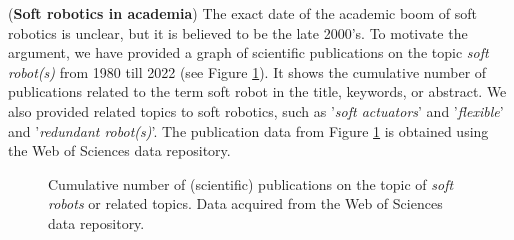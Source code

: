 
% 


\clearpage
(\textbf{Soft robotics in academia})
The exact date of the academic boom of soft robotics is unclear, but it is believed to be the late 2000's. To motivate the argument, we have provided a graph of scientific publications on the topic \textit{soft robot(s)} from 1980 till 2022 (see Figure \ref{fig:C0:publicationhistory}). It shows the cumulative number of publications related to the term soft robot in the title, keywords, or abstract. We also provided related topics to soft robotics, such as '\textit{soft actuators}' and '\textit{flexible}' and '\textit{redundant robot(s)}'. The publication data from Figure \ref{fig:C0:publicationhistory} is obtained using the Web of Sciences data repository. 

\begin{figure}[!t]
  \ifx\printFigures\undefined
  \else
  \centering
  
  \fi
  \caption{Cumulative number of (scientific) publications on the topic of \emph{soft robots} or related topics. Data acquired from the Web of Sciences data repository.}
  \label{fig:C0:publicationhistory}
\end{figure}
%